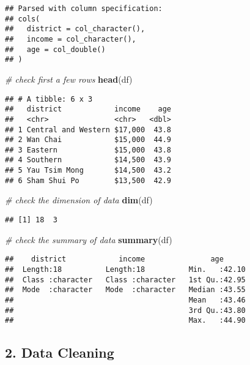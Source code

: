 \documentclass[]{article}
\newenvironment{Shaded}{\begin{snugshade}}{\end{snugshade}}
\newcommand{\CommentTok}[1]{\textcolor[rgb]{0.56,0.35,0.01}{\textit{#1}}}
\newcommand{\KeywordTok}[1]{\textcolor[rgb]{0.13,0.29,0.53}{\textbf{#1}}}
\newcommand{\NormalTok}[1]{#1}
\begin{document}
\begin{verbatim}
## Parsed with column specification:
## cols(
##   district = col_character(),
##   income = col_character(),
##   age = col_double()
## )
\end{verbatim}

\begin{Shaded}
\begin{Highlighting}[]
\CommentTok{# check first a few rows}
\KeywordTok{head}\NormalTok{(df)}
\end{Highlighting}
\end{Shaded}

\begin{verbatim}
## # A tibble: 6 x 3
##   district            income    age
##   <chr>               <chr>   <dbl>
## 1 Central and Western $17,000  43.8
## 2 Wan Chai            $15,000  44.9
## 3 Eastern             $15,000  43.8
## 4 Southern            $14,500  43.9
## 5 Yau Tsim Mong       $14,500  43.2
## 6 Sham Shui Po        $13,500  42.9
\end{verbatim}

\begin{Shaded}
\begin{Highlighting}[]
\CommentTok{# check the dimension of data}
\KeywordTok{dim}\NormalTok{(df)}
\end{Highlighting}
\end{Shaded}

\begin{verbatim}
## [1] 18  3
\end{verbatim}

\begin{Shaded}
\begin{Highlighting}[]
\CommentTok{# check the summary of data}
\KeywordTok{summary}\NormalTok{(df)}
\end{Highlighting}
\end{Shaded}

\begin{verbatim}
##    district            income               age       
##  Length:18          Length:18          Min.   :42.10  
##  Class :character   Class :character   1st Qu.:42.95  
##  Mode  :character   Mode  :character   Median :43.55  
##                                        Mean   :43.46  
##                                        3rd Qu.:43.80  
##                                        Max.   :44.90
\end{verbatim}

\hypertarget{data-cleaning}{%
\subsection{2. Data Cleaning}\label{data-cleaning}}
\end{document}

